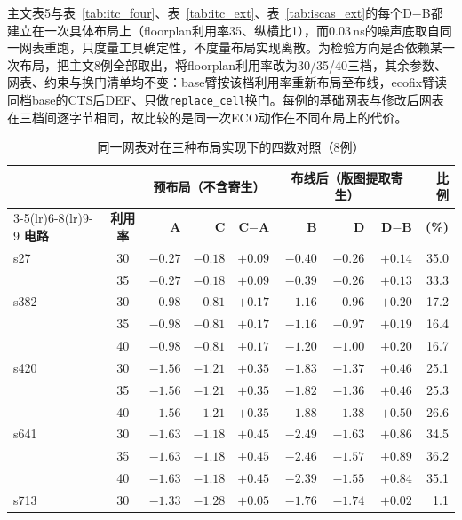 \documentclass[twocolumn,10pt,fontset=windows]{ctexart}
\begin{document}
主文表5与表~\ref{tab:itc_four}、表~\ref{tab:itc_ext}、表~\ref{tab:iscas_ext}的每个D$-$B都建立在一次具体布局上（floorplan利用率35、纵横比1），而0.03\,ns的噪声底取自同一网表重跑，只度量工具确定性，不度量布局实现离散。为检验方向是否依赖某一次布局，把主文8例全部取出，将floorplan利用率改为30/35/40三档，其余参数、网表、约束与换门清单均不变：base臂按该档利用率重新布局至布线，ecofix臂读同档base的CTS后DEF、只做\texttt{replace\_cell}换门。每例的基础网表与修改后网表在三档间逐字节相同，故比较的是同一次ECO动作在不同布局上的代价。

\begin{table}[t]
\centering\caption{同一网表对在三种布局实现下的四数对照（8例）}\label{tab:layout_stab}
\small\setlength{\tabcolsep}{5pt}
\begin{tabular}{lcrrrrrrr}
\toprule
 & & \multicolumn{3}{c}{\textbf{预布局（不含寄生）}} & \multicolumn{3}{c}{\textbf{布线后（版图提取寄生）}} & \textbf{比例}\\
\cmidrule(lr){3-5}\cmidrule(lr){6-8}\cmidrule(lr){9-9}
\textbf{电路} & \textbf{利用率} & \textbf{A} & \textbf{C} & \textbf{C$-$A} & \textbf{B} & \textbf{D} & \textbf{D$-$B} & \textbf{(\%)}\\
\midrule
s27 & 30 & $-0.27$ & $-0.18$ & $+0.09$ & $-0.40$ & $-0.26$ & $+0.14$ & 35.0\\
 & 35 & $-0.27$ & $-0.18$ & $+0.09$ & $-0.39$ & $-0.26$ & $+0.13$ & 33.3\\
\midrule
s382 & 30 & $-0.98$ & $-0.81$ & $+0.17$ & $-1.16$ & $-0.96$ & $+0.20$ & 17.2\\
 & 35 & $-0.98$ & $-0.81$ & $+0.17$ & $-1.16$ & $-0.97$ & $+0.19$ & 16.4\\
 & 40 & $-0.98$ & $-0.81$ & $+0.17$ & $-1.20$ & $-1.00$ & $+0.20$ & 16.7\\
\midrule
s420 & 30 & $-1.56$ & $-1.21$ & $+0.35$ & $-1.83$ & $-1.37$ & $+0.46$ & 25.1\\
 & 35 & $-1.56$ & $-1.21$ & $+0.35$ & $-1.82$ & $-1.36$ & $+0.46$ & 25.3\\
 & 40 & $-1.56$ & $-1.21$ & $+0.35$ & $-1.88$ & $-1.38$ & $+0.50$ & 26.6\\
\midrule
s641 & 30 & $-1.63$ & $-1.18$ & $+0.45$ & $-2.49$ & $-1.63$ & $+0.86$ & 34.5\\
 & 35 & $-1.63$ & $-1.18$ & $+0.45$ & $-2.46$ & $-1.57$ & $+0.89$ & 36.2\\
 & 40 & $-1.63$ & $-1.18$ & $+0.45$ & $-2.39$ & $-1.55$ & $+0.84$ & 35.1\\
\midrule
s713 & 30 & $-1.33$ & $-1.28$ & $+0.05$ & $-1.76$ & $-1.74$ & $+0.02$ & 1.1\\

\end{tabular}
\end{table}
\end{document}
